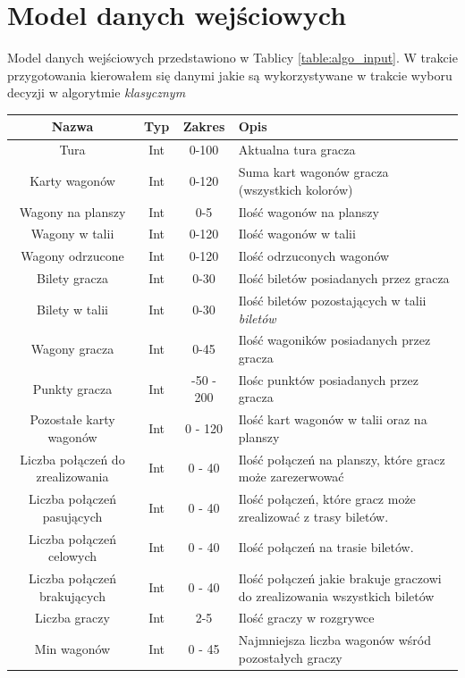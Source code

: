 \documentclass[12pt, oneside]{report}
\begin{document}
\section{Model danych wejściowych}
Model danych wejściowych przedstawiono w Tablicy \ref{table:algo_input}. W trakcie przygotowania kierowałem się danymi jakie są wykorzystywane w trakcie wyboru decyzji w algorytmie \textit{klasycznym}

\begin{longtable}[h]{| c | c | c | p{6.5cm} |} \hline
	Nazwa & Typ & Zakres & Opis \\ \hline	
	Tura & Int & 0-100 & Aktualna tura gracza \\ \hline
	Karty wagonów & Int & 0-120 & Suma kart wagonów gracza (wszystkich kolorów) \\ \hline
	Wagony na planszy & Int & 0-5 & Ilość wagonów na planszy \\ \hline
	Wagony w talii & Int & 0-120 & Ilość wagonów w talii \\ \hline
	Wagony odrzucone & Int & 0-120 & Ilość odrzuconych wagonów \\ \hline
	Bilety gracza & Int & 0-30 & Ilość biletów posiadanych przez gracza \\ \hline
	Bilety w talii & Int & 0-30 & Ilość biletów pozostających w talii \textit{biletów} \\ \hline
	Wagony gracza & Int & 0-45 & Ilość wagoników posiadanych przez gracza \\ \hline
	Punkty gracza & Int & -50 - 200 & Ilośc punktów posiadanych przez gracza \\ \hline
	Pozostałe karty wagonów & Int & 0 - 120 & Ilość kart wagonów w talii oraz na planszy  \\ \hline
	Liczba połączeń do zrealizowania & Int & 0 - 40 & Ilość połączeń na planszy, które gracz może zarezerwować \\ \hline
	Liczba połączeń pasujących & Int & 0 - 40 & Ilość połączeń, które gracz może zrealizować z trasy biletów. \\ \hline
	Liczba połączeń celowych & Int & 0 - 40 & Ilość połączeń na trasie biletów. \\ \hline
	Liczba połączeń brakujących & Int & 0 - 40 & Ilość połączeń jakie brakuje graczowi do zrealizowania wszystkich biletów \\ \hline
	Liczba graczy & Int & 2-5 & Ilość graczy w rozgrywce \\ \hline
	Min wagonów  & Int & 0 - 45 & Najmniejsza liczba wagonów wśród pozostałych graczy \\ \hline

\end{longtable}
\end{document}
